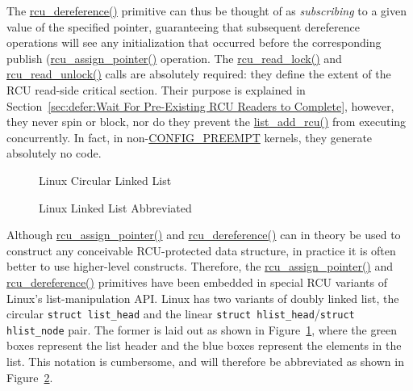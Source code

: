 The \url{rcu_dereference()} primitive can thus be thought of
as \emph{subscribing} to a given value of the specified pointer,
guaranteeing that subsequent dereference operations will see any
initialization that occurred before the corresponding publish
(\url{rcu_assign_pointer()} operation.
The \url{rcu_read_lock()} and \url{rcu_read_unlock()}
calls are absolutely required: they define the extent of the
RCU read-side critical section.
Their purpose is explained in
Section~\ref{sec:defer:Wait For Pre-Existing RCU Readers to Complete},
however, they never spin or block, nor do they prevent the
\url{list_add_rcu()} from executing concurrently.
In fact, in non-\url{CONFIG_PREEMPT} kernels, they generate
absolutely no code.

\begin{figure}[tb]
\begin{center}
\end{center}
\caption{Linux Circular Linked List}
\label{fig:defer:Linux Circular Linked List}
\end{figure}

\begin{figure}[tb]
\begin{center}
\end{center}
\caption{Linux Linked List Abbreviated}
\label{fig:defer:Linux Linked List Abbreviated}
\end{figure}

Although \url{rcu_assign_pointer()} and
\url{rcu_dereference()} can in theory be used to construct any
conceivable RCU-protected data structure, in practice it is often better
to use higher-level constructs.
Therefore, the \url{rcu_assign_pointer()} and
\url{rcu_dereference()}
primitives have been embedded in special RCU variants of Linux's
list-manipulation API.
Linux has two variants of doubly linked list, the circular
{\tt struct list\_head} and the linear
{\tt struct hlist\_head}/{\tt struct hlist\_node} pair.
The former is laid out as shown in
Figure~\ref{fig:defer:Linux Circular Linked List},
where the green boxes represent
the list header and the blue boxes represent the elements in the
list.
This notation is cumbersome, and will therefore be abbreviated as shown in
Figure~\ref{fig:defer:Linux Linked List Abbreviated}.

